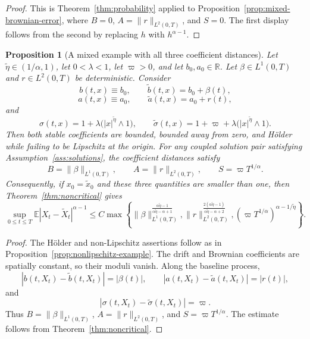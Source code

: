 \documentclass[11pt]{article}
\newtheorem{proposition}[theorem]{Proposition}
\newcommand{\R}{\mathbb{R}}
\newcommand{\E}{\mathbb{E}}
\newcommand{\1}{\mathbf{1}}
\newcommand{\wt}{\tilde}
\begin{document}
\begin{proof}
This is Theorem~\ref{thm:probability} applied to Proposition~\ref{prop:mixed-brownian-error}, where $B=0$, $A=\|r\|_{L^2(0,T)}$, and $S=0$. The first display follows from the second by replacing $h$ with $h^{\alpha-1}$.
\end{proof}

\begin{proposition}[A mixed example with all three coefficient distances]\label{prop:all-errors-example}
Let $\wt\eta\in(1/\alpha,1)$, let $0<\lambda<1$, let $\varpi>0$, and let $b_0,a_0\in\R$. Let $\beta\in L^1(0,T)$ and $r\in L^2(0,T)$ be deterministic. Consider
\[
  b(t,x)\equiv b_0,
  \qquad
  \wt b(t,x)=b_0+\beta(t),
\]
\[
  a(t,x)\equiv a_0,
  \qquad
  \wt a(t,x)=a_0+r(t),
\]
and
\[
  \sigma(t,x)=1+\lambda\bigl(|x|^{\wt\eta}\wedge1\bigr),
  \qquad
  \wt\sigma(t,x)=1+\varpi+\lambda\bigl(|x|^{\wt\eta}\wedge1\bigr).
\]
Then both stable coefficients are bounded, bounded away from zero, and H\"older while failing to be Lipschitz at the origin. For any coupled solution pair satisfying Assumption~\ref{ass:solutions}, the coefficient distances satisfy
\[
  B=\|\beta\|_{L^1(0,T)},
  \qquad
  A=\|r\|_{L^2(0,T)},
  \qquad
  S=\varpi T^{1/\alpha}.
\]
Consequently, if $x_0=\wt x_0$ and these three quantities are smaller than one, then Theorem~\ref{thm:noncritical} gives
\[
\sup_{0\le t\le T}\E|X_t-\wt X_t|^{\alpha-1}
\le C\max\left\{
\|\beta\|_{L^1(0,T)}^{\frac{\alpha\wt\eta-1}{\alpha\wt\eta-\alpha+1}},
\|r\|_{L^2(0,T)}^{\frac{2(\alpha\wt\eta-1)}{\alpha\wt\eta-\alpha+2}},
(\varpi T^{1/\alpha})^{\alpha-1/\wt\eta}
\right\}.
\]
\end{proposition}

\begin{proof}
The H\"older and non-Lipschitz assertions follow as in Proposition~\ref{prop:nonlipschitz-example}. The drift and Brownian coefficients are spatially constant, so their moduli vanish. Along the baseline process,
\[
  |b(t,X_t)-\wt b(t,X_t)|=|\beta(t)|,
  \qquad
  |a(t,X_t)-\wt a(t,X_t)|=|r(t)|,
\]
and
\[
  |\sigma(t,X_t)-\wt\sigma(t,X_t)|=\varpi.
\]
Thus $B=\|\beta\|_{L^1(0,T)}$, $A=\|r\|_{L^2(0,T)}$, and $S=\varpi T^{1/\alpha}$. The estimate follows from Theorem~\ref{thm:noncritical}.
\end{proof}
\end{document}

